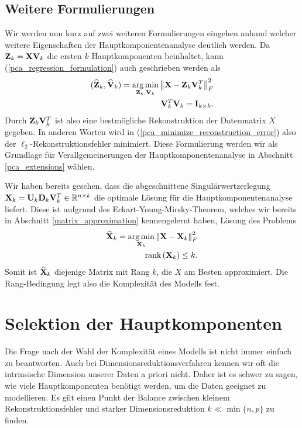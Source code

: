 \subsection{Weitere Formulierungen} 

Wir werden nun kurz auf zwei weiteren Formulierungen eingehen anhand welcher weitere Eigenschaften der Hauptkomponentenanalyse deutlich werden. Da $\mathbf{Z}_k = \mathbf{X} \mathbf{V}_k$ die ersten $k$ Hauptkomponenten beinhaltet, kann (\ref{pca_regression_formulation}) auch geschrieben werden als
\begin{align}
\label{pca_minimize_reconstruction_error}
\begin{split}
(\widehat{\mathbf{Z}}_k, \widehat{\mathbf{V}}_k) = \operatorname*{arg\,min}_{\mathbf{Z}_k, \mathbf{V}_k} \left\lVert \mathbf{X} - \mathbf{Z}_k \mathbf{V}_k^T \right\rVert_{F}^{2}\\
\mathbf{V}_k^T\mathbf{V}_k = \mathbf{I}_{k \times k}.
\end{split}
\end{align}
Durch $\mathbf{Z}_k \mathbf{V}_k^T$ ist also eine bestmögliche Rekonstruktion der Datenmatrix $X$ gegeben. In anderen Worten wird in (\ref{pca_minimize_reconstruction_error}) also der $\ell_2$-Rekonstruktionsfehler minimiert. Diese Formulierung werden wir als Grundlage für Verallgemeinerungen der Hauptkomponentenanalyse in Abschnitt \ref{pca_extensions} wählen.

Wir haben bereits gesehen, dass die abgeschnittene Singulärwertzerlegung $\mathbf{X}_k = \mathbf{U}_k \mathbf{D}_k \mathbf{V}_k^T \in \mathbb{R}^{n \times k}$ die optimale Lösung für die Hauptkomponentenanalyse liefert. Diese ist aufgrund des Eckart-Young-Mirsky-Theorem, welches wir bereits in Abschnitt \ref{matrix_approximation} kennengelernt haben, Lösung des Problems
\begin{align}
\begin{split}
\widehat{\mathbf{X}}_k = \operatorname*{arg\,min}_{\mathbf{X}_k} \left\lVert \mathbf{X} - \mathbf{X}_k \right\rVert_F^2\\
\text{rank} \left( \mathbf{X}_k \right) \leq k.
\end{split}
\end{align}
Somit ist $\widehat{\mathbf{X}}_k$ diejenige Matrix mit Rang $k$, die $X$ am Besten approximiert. Die Rang-Bedingung legt also die Komplexität des Modells fest.

\section{Selektion der Hauptkomponenten}
\label{selection_principal_components}

Die Frage nach der Wahl der Komplexität eines Modells ist nicht immer einfach zu beantworten. Auch bei Dimensionsreduktionsverfahren kennen wir oft die intrinsische Dimension unserer Daten a priori nicht. Daher ist es schwer zu sagen, wie viele Hauptkomponenten benötigt werden, um die Daten geeignet zu modellieren. Es gilt einen Punkt der Balance zwischen kleinem Rekonstruktionsfehler und starker Dimensionsreduktion $k \ll \min\{n, p\}$ zu finden. 

